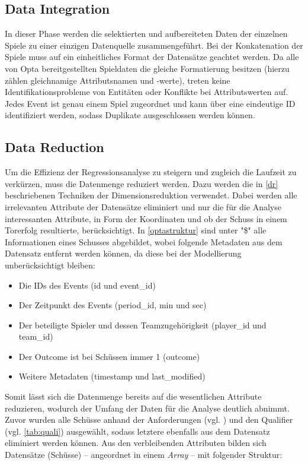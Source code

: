 \subsection{Data Integration}
\label{datai}
In dieser Phase werden die selektierten und aufbereiteten Daten der einzelnen Spiele zu einer einzigen Datenquelle zusammengeführt. Bei der Konkatenation der Spiele muss auf ein einheitliches Format der Datensätze geachtet werden. Da alle von Opta bereitgestellten Spieldaten die gleiche Formatierung besitzen (hierzu zählen gleichnamige Attributsnamen und -werte), treten keine Identifikationsprobleme von Entitäten oder Konflikte bei Attributswerten auf. Jedes Event ist genau einem Spiel zugeordnet und kann über eine eindeutige ID identifiziert werden, sodass Duplikate ausgeschlossen werden können.
\newpage

\subsection{Data Reduction}
\label{datar}
Um die Effizienz der Regressionsanalyse zu steigern und zugleich die Laufzeit zu verkürzen, muss die Datenmenge reduziert werden. Dazu werden die in \vref{dr} beschriebenen Techniken der Dimensionsreduktion verwendet. Dabei werden alle irrelevanten Attribute der Datensätze eliminiert und nur die für die Analyse interessanten Attribute, in Form der Koordinaten und ob der Schuss in einem Torerfolg resultierte, berücksichtigt. In \vref{optastruktur} sind unter \textsf{"\$"} alle Informationen eines Schusses abgebildet, wobei folgende Metadaten aus dem Datensatz entfernt werden können, da diese bei der Modellierung unberücksichtigt bleiben:

\begin{itemize}
\item Die IDs des Events (\textsf{id} und \textsf{event\_id})
\item Der Zeitpunkt des Events (\textsf{period\_id}, \textsf{min} und \textsf{sec})
\item Der beteiligte Spieler und dessen Teamzugehörigkeit (\textsf{player\_id} und \textsf{team\_id})
\item Der Outcome ist bei Schüssen immer \textsf{1} (\textsf{outcome})
\item Weitere Metadaten (\textsf{timestamp} und \textsf{last\_modified})
\end{itemize}

Somit lässt sich die Datenmenge bereits auf die wesentlichen Attribute reduzieren, wodurch der Umfang der Daten für die Analyse deutlich abnimmt. Zuvor wurden alle Schüsse anhand der Anforderungen (vgl. ) und den Qualifier (vgl. \vref{tab:quali}) ausgewählt, sodass letztere ebenfalls aus dem Datensatz eliminiert werden können. Aus den verbleibenden Attributen bilden sich Datensätze (Schüsse) -- angeordnet in einem \textit{Array} -- mit folgender Struktur:
\newline\enlargethispage{2\baselineskip} 

